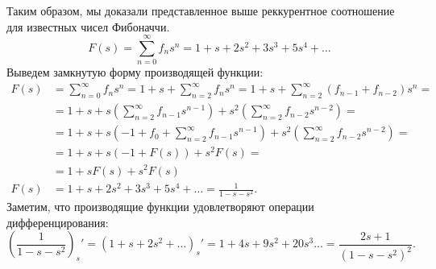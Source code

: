 \documentclass[a4paper,14pt]{article}
\begin{document}
Таким образом, мы доказали представленное выше реккурентное соотношение для известных
чисел Фибоначчи.
\[
	F(s) = \sum_{n=0}^{\infty} f_ns^n = 1 + s + 2s^2 + 3s^3 + 5s^4 + \ldots
\]
Выведем замкнутую форму производящей функции:
\begin{align*}
	F(s) &= \sum_{n=0}^{\infty} f_ns^n = 1 + s + \sum_{n=2}^{\infty} f_ns^n =
	1 + s + \sum_{n=2}^{\infty} (f_{n - 1} + f_{n - 2})s^n = \\ 
		 &= 1 + s + s\left(\sum_{n=2}^{\infty} f_{n - 1}s^{n - 1}\right) +
	s^2\left( \sum_{n=2}^{\infty} f_{n - 2}s^{n - 2} \right) = \\
		 &= 
		 1 + s + s\left(-1 + f_0 + \sum_{n=2}^{\infty} f_{n - 1}s^{n - 1}\right) +
		 s^2\left( \sum_{n=2}^{\infty} f_{n - 2}s^{n - 2} \right) = \\
		 &=
		 1 + s + s\left(-1 + F(s)\right) + s^2F(s) = \\
		 &=
		 1 + sF(s) + s^2F(s) \\
	F(s) &= 1 + s + 2s^2 + 3s^3 + 5s^4 + \ldots = \frac{1}{1 - s - s^2}
.\end{align*}
Заметим, что производящие функции удовлетворяют операции дифференцирования:
\[
	\left(\frac{1}{1 - s - s^2}\right)_s' = (1 + s + 2s^2 + \ldots)_s' =
	 1 + 4s + 9s^2 + 20s^3\ldots = \frac{2s+1}{(1 - s - s^2)^2}
.\] 
\end{document}
